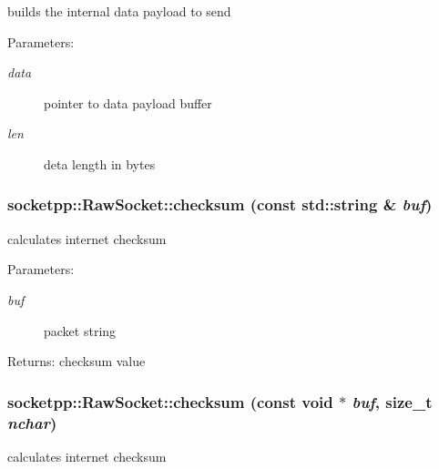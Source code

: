 builds the internal data payload to send 

\begin{Desc}
\item[Parameters:]
\begin{description}
\item[{\em data}]pointer to data payload buffer \item[{\em len}]deta length in bytes \end{description}
\end{Desc}
\hypertarget{classsocketpp_1_1RawSocket_67af2c9f3bc37146b54fc9fb69c0dd8d}{
\subsubsection[{checksum}]{ socketpp::RawSocket::checksum (const std::string \& {\em buf})}}
\label{classsocketpp_1_1RawSocket_67af2c9f3bc37146b54fc9fb69c0dd8d}


calculates internet checksum 

\begin{Desc}
\item[Parameters:]
\begin{description}
\item[{\em buf}]packet string \end{description}
\end{Desc}
\begin{Desc}
\item[Returns:]checksum value \end{Desc}
\hypertarget{classsocketpp_1_1RawSocket_bb78ecebb5bd5ab5be4ee46d786fe5cd}{
\subsubsection[{checksum}]{ socketpp::RawSocket::checksum (const void $\ast$ {\em buf}, \/  size\_\-t {\em nchar})}}
\label{classsocketpp_1_1RawSocket_bb78ecebb5bd5ab5be4ee46d786fe5cd}


calculates internet checksum 

